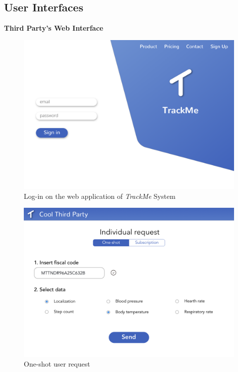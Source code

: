 \subsection{User Interfaces}

\textbf{Third Party's Web Interface}

\begin{figure}[H]
    \centering
    \includegraphics[scale=0.2]{Pictures/Mockup/web/login.png}
    \caption{Log-in on the web application of  \emph{TrackMe} System}
\end{figure}

\begin{figure}[H]
    \centering
    \includegraphics[scale=0.2]{Pictures/Mockup/web/individual1.png}
    \caption{One-shot user request}
\end{figure}

